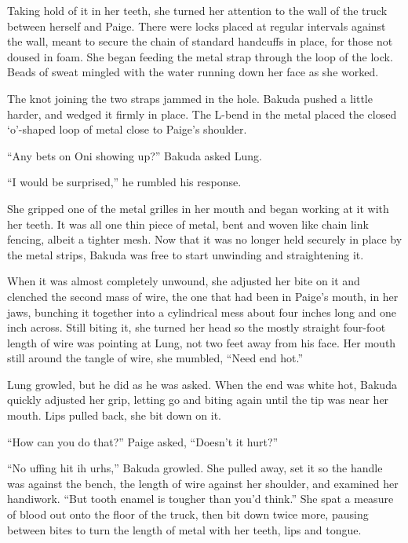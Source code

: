 Taking hold of it in her teeth, she turned her attention to the wall of the truck between herself and Paige.  There were locks placed at regular intervals against the wall, meant to secure the chain of standard handcuffs in place, for those not doused in foam.  She began feeding the metal strap through the loop of the lock.  Beads of sweat mingled with the water running down her face as she worked.



The knot joining the two straps jammed in the hole.  Bakuda pushed a little harder, and wedged it firmly in place.  The L-bend in the metal placed the closed `o'-shaped loop of metal close to Paige's shoulder.



``Any bets on Oni showing up?'' Bakuda asked Lung.



``I would be surprised,'' he rumbled his response.



She gripped one of the metal grilles in her mouth and began working at it with her teeth.  It was all one thin piece of metal, bent and woven like chain link fencing, albeit a tighter mesh.  Now that it was no longer held securely in place by the metal strips, Bakuda was free to start unwinding and straightening it.



When it was almost completely unwound, she adjusted her bite on it and clenched the second mass of wire, the one that had been in Paige's mouth, in her jaws, bunching it together into a cylindrical mess about four inches long and one inch across.  Still biting it, she turned her head so the mostly straight four-foot length of wire was pointing at Lung, not two feet away from his face.  Her mouth still around the tangle of wire, she mumbled, ``Need end hot.''



Lung growled, but he did as he was asked.  When the end was white hot, Bakuda quickly adjusted her grip, letting go and biting again until the tip was near her mouth.  Lips pulled back, she bit down on it.



``How can you do that?'' Paige asked, ``Doesn't it hurt?''



``No uffing hit ih urhs,'' Bakuda growled.  She pulled away, set it so the handle was against the bench, the length of wire against her shoulder, and examined her handiwork.  ``But tooth enamel is tougher than you'd think.''  She spat a measure of blood out onto the floor of the truck, then bit down twice more, pausing between bites to turn the length of metal with her teeth, lips and tongue.



